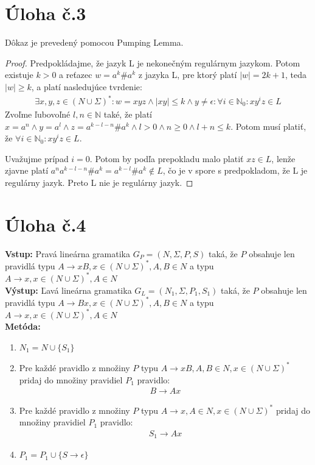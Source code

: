 \documentclass[10pt]{article}
\begin{document}
\section*{Úloha č.3}
Dôkaz je prevedený pomocou Pumping Lemma. 
\begin{proof}
Predpokládajme, že jazyk L je nekonečným regulárnym jazykom. Potom existuje $k > 0$ a reťazec $w =
a^k\#a^k$ z jazyka L, pre ktorý platí $|w| = 2k+1$, teda $|w|\geq k$, a platí nasledujúce tvrdenie:
\begin{align*}
    \exists x,y,z \in (N \cup \Sigma)^*: w = xyz \land |xy| \leq k \land y \neq \epsilon : \forall i \in
    \mathbb{N}_0: xy^iz \in L 
\end{align*}
    Zvoľme ľubovoľné $l,n \in \mathbb{N}$ také, že platí $x = a^{n} \land y = a^{l} \land z =
    a^{k-l-n}\#a^k \land l > 0 \land n \geq 0 \land l+n \leq k$. Potom musí platiť, že $\forall
i \in \mathbb{N}_0: xy^iz \in L$.

Uvažujme prípad $i = 0$. Potom by podľa prepokladu malo platiť $xz \in L$, lenže zjavne platí
    $a^{n}a^{k-l-n}\#a^{k} = a^{k-l}\#a^{k} \notin L$, čo je v spore s predpokladom, že L je regulárny jazyk. Preto L nie je regulárny jazyk.
\end{proof}


\section*{Úloha č.4}

\textbf{Vstup:} Pravá lineárna gramatika $G_P = (N, \Sigma, P, S)$ taká, že $P$ obsahuje len pravidlá typu
$A\to xB, x \in (N\cup\Sigma)^*, A,B \in N$ a typu $A\to x, x \in (N\cup\Sigma)^*, A \in N$\\
\textbf{Výstup:} Ľavá lineárna gramatika $G_L = (N_1, \Sigma, P_1, S_1)$ taká, že $P$ obsahuje len pravidlá typu
$A\to Bx, x \in (N\cup\Sigma)^*, A,B \in N$ a typu $A\to x, x \in (N\cup\Sigma)^*, A \in N$\\
\textbf{Metóda:}
\begin{enumerate}
    \item $N_1 = N \cup \{S_1\}$
    \item Pre každé pravidlo z množiny $P$ typu $A\to xB, A,B \in N, x \in (N\cup\Sigma)^*$ pridaj
        do množiny pravidiel $P_1$ pravidlo:\\
        \begin{align*}
            B\to Ax
        \end{align*}
    \item Pre každé pravidlo z množiny $P$ typu $A\to x, A \in N, x \in (N\cup\Sigma)^*$ pridaj do
        množiny pravidiel $P_1$ pravidlo:\\
        \begin{align*}
            S_1\to Ax
        \end{align*}
    \item $P_1 = P_1 \cup \{S\to\epsilon\}$
\end{enumerate}
\end{document}
